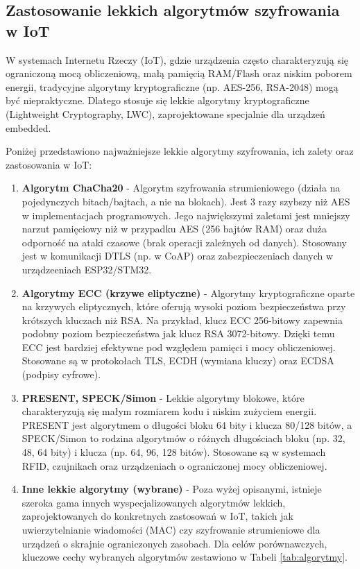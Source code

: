 \subsection{Zastosowanie lekkich algorytmów szyfrowania w IoT}
W systemach Internetu Rzeczy (IoT), gdzie urządzenia często charakteryzują się ograniczoną mocą obliczeniową, małą pamięcią RAM/Flash oraz niskim poborem energii, tradycyjne algorytmy kryptograficzne (np. AES-256, RSA-2048) mogą być niepraktyczne. Dlatego stosuje się lekkie algorytmy kryptograficzne (Lightweight Cryptography, LWC), zaprojektowane specjalnie dla urządzeń embedded.

Poniżej przedstawiono najważniejsze lekkie algorytmy szyfrowania, ich zalety oraz zastosowania w IoT:
\begin{enumerate}
    \item \textbf{Algorytm ChaCha20} - Algorytm szyfrowania strumieniowego (działa na pojedynczych bitach/bajtach, a nie na blokach). Jest 3 razy szybszy niż AES w implementacjach programowych. Jego największymi zaletami jest mniejszy narzut pamięciowy niż w przypadku AES (256 bajtów RAM) oraz duża odporność na ataki czasowe (brak operacji zależnych od danych). Stosowany jest w komunikacji DTLS (np. w CoAP) oraz zabezpieczeniach danych w urządzeeniach ESP32/STM32.
    \item \textbf{Algorytmy ECC (krzywe eliptyczne)} - Algorytmy kryptograficzne oparte na krzywych eliptycznych, które oferują wysoki poziom bezpieczeństwa przy krótszych kluczach niż RSA. Na przykład, klucz ECC 256-bitowy zapewnia podobny poziom bezpieczeństwa jak klucz RSA 3072-bitowy. Dzięki temu ECC jest bardziej efektywne pod względem pamięci i mocy obliczeniowej. Stosowane są w protokołach TLS, ECDH (wymiana kluczy) oraz ECDSA (podpisy cyfrowe).
    \item \textbf{PRESENT, SPECK/Simon} - Lekkie algorytmy blokowe, które charakteryzują się małym rozmiarem kodu i niskim zużyciem energii. PRESENT jest algorytmem o długości bloku 64 bity i klucza 80/128 bitów, a SPECK/Simon to rodzina algorytmów o różnych długościach bloku (np. 32, 48, 64 bity) i klucza (np. 64, 96, 128 bitów). Stosowane są w systemach RFID, czujnikach oraz urządzeniach o ograniczonej mocy obliczeniowej.
    \item \textbf{Inne lekkie algorytmy (wybrane)} - Poza wyżej opisanymi, istnieje szeroka gama innych wyspecjalizowanych algorytmów lekkich, zaprojektowanych do konkretnych zastosowań w IoT, takich jak uwierzytelnianie wiadomości (MAC) czy szyfrowanie strumieniowe dla urządzeń o skrajnie ograniczonych zasobach. Dla celów porównawczych, kluczowe cechy wybranych algorytmów zestawiono w Tabeli \ref{tab:algorytmy}.

\end{enumerate}
